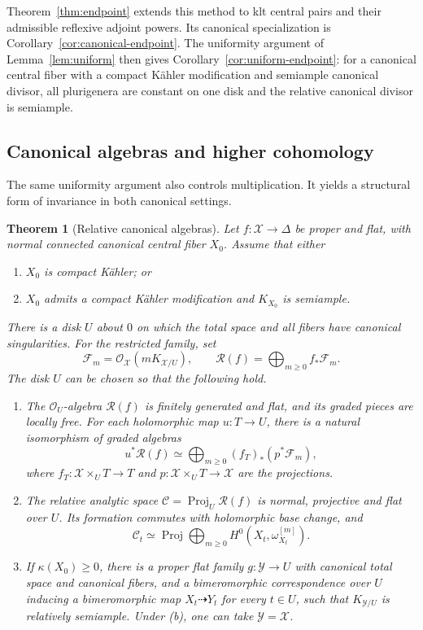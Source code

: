\documentclass[11pt,a4paper]{article}
\numberwithin{equation}{section}
\newtheorem{maintheorem}{Theorem}
\theoremstyle{definition}
\theoremstyle{remark}
\newcommand{\OO}{\mathcal O}\newcommand{\cX}{\mathcal X}
\newcommand{\Proj}{\operatorname{Proj}}
\begin{document}
Theorem~\ref{thm:endpoint} extends this method to klt central pairs
and their admissible reflexive adjoint powers. Its canonical
specialization is Corollary~\ref{cor:canonical-endpoint}.
The uniformity argument of Lemma~\ref{lem:uniform} then gives
Corollary~\ref{cor:uniform-endpoint}: for a canonical central fiber
with a compact Kähler modification and semiample canonical divisor,
all plurigenera are constant on one disk and the relative canonical
divisor is semiample.

\subsection{Canonical algebras and higher cohomology}

The same uniformity argument also controls multiplication. It yields
a structural form of invariance in both canonical settings.

\begin{maintheorem}[Relative canonical algebras]
\label{thm:canonical-algebra}\label{cor:relative-canonical-algebra}
Let $f:\mathcal X\to\Delta$ be proper and flat, with normal connected
canonical central fiber $X_0$. Assume that either
\begin{enumerate}[label=\textup{(\alph*)}]
\item $X_0$ is compact Kähler; or
\item $X_0$ admits a compact Kähler modification and $K_{X_0}$ is semiample.
\end{enumerate}
There is a disk $U$ about $0$ on which the total space and all fibers
have canonical singularities. For the restricted family, set
\[
 \mathcal F_m=\OO_{\mathcal X}(mK_{\mathcal X/U}),\qquad
 \mathcal R(f)=\bigoplus_{m\ge0}f_*\mathcal F_m.
\]
The disk $U$ can be chosen so that the following hold.
\begin{enumerate}[label=\textup{(\roman*)}]
\item The $\OO_U$-algebra $\mathcal R(f)$ is finitely generated and
flat, and its graded pieces are locally free. For each holomorphic
map $u:T\to U$, there is a natural isomorphism of graded algebras
\[
 u^*\mathcal R(f)\simeq
 \bigoplus_{m\ge0}(f_T)_*(p^*\mathcal F_m),
\]
where $f_T:\mathcal X\times_U T\to T$ and
$p:\mathcal X\times_U T\to\mathcal X$ are the projections.
\item The relative analytic space $\mathcal C=\Proj_U\mathcal R(f)$
is normal, projective and flat over $U$. Its formation commutes
with holomorphic base change, and
\[
 \mathcal C_t\simeq\Proj\bigoplus_{m\ge0}
 H^0(X_t,\omega_{X_t}^{[m]}).
\]
\item If $\kappa(X_0)\ge0$, there is a proper flat family
$g:\mathcal Y\to U$ with canonical total space and canonical fibers,
and a bimeromorphic correspondence over $U$ inducing a bimeromorphic
map $X_t\dashrightarrow Y_t$ for every $t\in U$, such that
$K_{\mathcal Y/U}$ is relatively semiample. Under \textup{(b)}, one
can take $\mathcal Y=\mathcal X$.
\end{enumerate}
\end{maintheorem}
\end{document}
